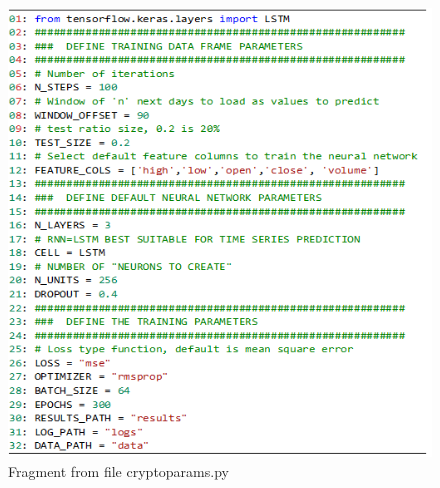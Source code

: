 \begin{figure}[H]
   \centering
   \includegraphics[width=\linewidth]{fig/CodeSnippetMLSettings.png}
    \caption{Fragment from file  crypto\textunderscore params.py}
    \label{fig:CodeSnippetMLSettings}
\end{figure}

